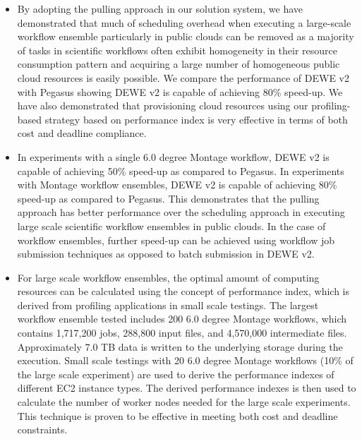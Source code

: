 \begin{itemize}
	\item By adopting the pulling approach in our solution system, we have demonstrated that much of scheduling overhead when executing a large-scale workflow ensemble particularly in public clouds can be removed as a majority of tasks in scientific workflows often exhibit homogeneity in their resource consumption pattern and acquiring a large number of homogeneous public cloud resources is easily possible. We compare the performance of DEWE v2 with Pegasus showing DEWE v2 is capable of achieving 80\% speed-up. We have also demonstrated that provisioning cloud resources using our profiling-based strategy based on performance index is very effective in terms of both cost and deadline compliance.
	\item In experiments with a single 6.0 degree Montage workflow, DEWE v2 is capable of achieving 50\% speed-up as compared to Pegasus. In experiments with Montage workflow ensembles, DEWE v2 is capable of achieving 80\% speed-up as compared to Pegasus. This demonstrates that the pulling approach has better performance over the scheduling approach in executing large scale scientific workflow ensembles in public clouds. In the case of workflow ensembles, further speed-up can be achieved using workflow job submission techniques as opposed to batch submission in DEWE v2.
	\item For large scale workflow ensembles, the optimal amount of computing resources can be calculated using the concept of performance index, which is derived from profiling applications in small scale testings. The largest workflow ensemble tested includes 200 6.0 degree Montage workflows, which contains 1,717,200 jobs, 288,800 input files, and 4,570,000 intermediate files. Approximately 7.0 TB data is written to the underlying storage during the execution. Small scale testings with 20 6.0 degree Montage workflows (10\% of the large scale experiment) are used to derive the performance indexes of different EC2 instance types. The derived performance indexes is then used to calculate the number of worker nodes needed for the large scale experiments. This technique is proven to be effective in meeting both cost and deadline constraints. 
\end{itemize}
